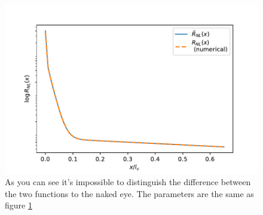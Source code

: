 \begin{figure}[h!]
    \centering
    \includegraphics[width=\linewidth]{Immagini/rnl/xapprox.pdf}
    \caption{As you can see it's impossible to distinguish the difference between the two functions to the naked eye. The parameters are the same as figure \ref{fig:rnlxapprox}}
    \label{fig:rnlxapprox}
\end{figure}